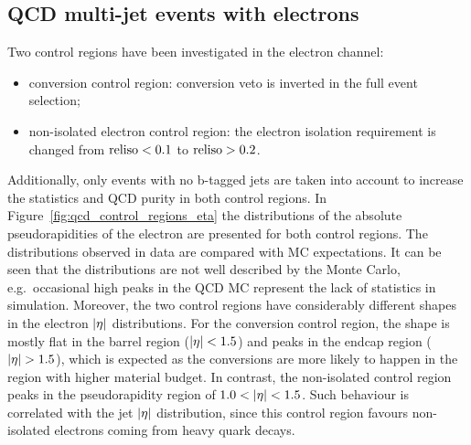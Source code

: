 \subsection{QCD multi-jet events with electrons}
Two control regions have been investigated in the electron channel:

\begin{itemize}
\item conversion control region: conversion veto is inverted in the full event selection;
\item non-isolated electron control region: the electron isolation requirement is changed from $\textrm{reliso} < 0.1$ to
$\textrm{reliso} > 0.2$.
\end{itemize}

Additionally, only events with no b-tagged jets are taken into account to increase the statistics and QCD purity in both
control regions. In Figure~\ref{fig:qcd_control_regions_eta} the distributions of the absolute pseudorapidities of the
electron are presented for both control regions. The distributions observed in data are compared with MC expectations.
It can be seen that the distributions are not well described by the Monte Carlo, e.g.\ occasional high peaks in the QCD
MC represent the lack of statistics in simulation. Moreover, the two control regions have considerably different shapes
in the electron $\lvert \eta \rvert$ distributions. For the conversion control region, the shape is mostly flat in the barrel
region ($\lvert \eta \rvert < 1.5$) and peaks in the endcap region ($\lvert \eta \rvert > 1.5$), which is expected as the conversions are
more likely to happen in the region with higher material budget. In contrast, the non-isolated control region peaks in
the pseudorapidity region of $1.0 < \lvert \eta \rvert < 1.5$. Such behaviour is correlated with the jet $\lvert \eta \rvert$ distribution, since this control region favours non-isolated electrons coming from heavy quark decays.

